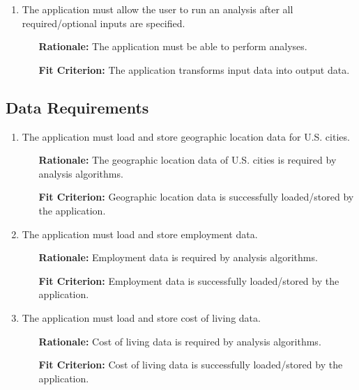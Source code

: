 \documentclass[english]{article}
\begin{document}
\begin{enumerate}[\bf{FIR}1.]
    \item The application must allow the user to run an analysis after all required/optional inputs are specified.
	\begin{enumerate}[leftmargin=1cm]
        \item [{\bf Rationale:}] The application must be able to perform analyses.
        \item [{\bf Fit Criterion:}] The application transforms input data into output data.
	\end{enumerate}
	

\end{enumerate}

\subsection{Data Requirements}
\begin{enumerate}[\bf{FDR}1.]
	\item The application must load and store geographic location data for U.S. cities.
	\begin{enumerate}[leftmargin=1cm]
        \item [{\bf Rationale:}] The geographic location data of U.S. cities is required by analysis algorithms.
        \item [{\bf Fit Criterion:}] Geographic location data is successfully loaded/stored by the application.
	\end{enumerate}

	\item The application must load and store employment data.
	\begin{enumerate}[leftmargin=1cm]
        \item [{\bf Rationale:}] Employment data is required by analysis algorithms.
        \item [{\bf Fit Criterion:}] Employment data is successfully loaded/stored by the application.
	\end{enumerate}

	\item The application must load and store cost of living data.
	\begin{enumerate}[leftmargin=1cm]
        \item [{\bf Rationale:}] Cost of living data is required by analysis algorithms.
        \item [{\bf Fit Criterion:}] Cost of living data is successfully loaded/stored by the application.
	\end{enumerate}
	

\end{enumerate}
\end{document}
